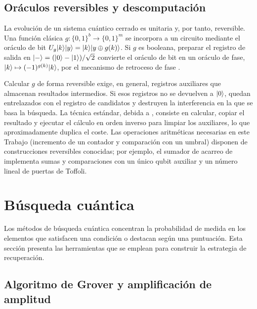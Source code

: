 \subsection{Oráculos reversibles y descomputación}

La evolución de un sistema cuántico cerrado es unitaria y, por tanto, reversible. Una función clásica \(g:\{0,1\}^b\to\{0,1\}^m\) se incorpora a un circuito mediante el oráculo de bit \(U_g\lvert k\rangle\lvert y\rangle=\lvert k\rangle\lvert y\oplus g(k)\rangle\). Si \(g\) es booleana, preparar el registro de salida en \(\lvert -\rangle=(\lvert 0\rangle-\lvert 1\rangle)/\sqrt{2}\) convierte el oráculo de bit en un oráculo de fase, \(\lvert k\rangle\mapsto(-1)^{g(k)}\lvert k\rangle\), por el mecanismo de retroceso de fase \citep{nielsen2010}.

Calcular \(g\) de forma reversible exige, en general, registros auxiliares que almacenan resultados intermedios. Si esos registros no se devuelven a \(\lvert 0\rangle\), quedan entrelazados con el registro de candidatos y destruyen la interferencia en la que se basa la búsqueda. La técnica estándar, debida a \citet{bennett1973}, consiste en calcular, copiar el resultado y ejecutar el cálculo en orden inverso para limpiar los auxiliares, lo que aproximadamente duplica el coste. Las operaciones aritméticas necesarias en este Trabajo (incremento de un contador y comparación con un umbral) disponen de construcciones reversibles conocidas; por ejemplo, el sumador de acarreo de \citet{cuccaro2004} implementa sumas y comparaciones con un único qubit auxiliar y un número lineal de puertas de Toffoli.

\section{Búsqueda cuántica}
\label{sec:busqueda}

Los métodos de búsqueda cuántica concentran la probabilidad de medida en los elementos que satisfacen una condición o destacan según una puntuación. Esta sección presenta las herramientas que se emplean para construir la estrategia de recuperación.

\subsection{Algoritmo de Grover y amplificación de amplitud}

